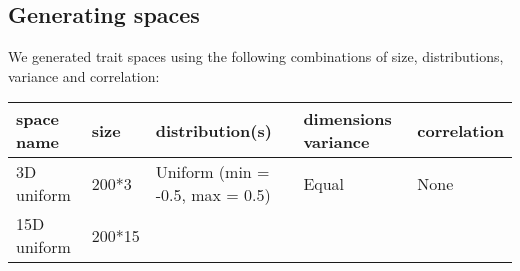 \documentclass[]{article}
\begin{document}
\subsection{Generating spaces}\label{generating-spaces}

We generated trait spaces using the following combinations of size,
distributions, variance and correlation:

\renewcommand\baselinestretch{1}\selectfont

\begin{longtable}[]{@{}lllll@{}}
\toprule
\begin{minipage}[b]{0.12\columnwidth}\raggedright\strut
space name\strut
\end{minipage} & \begin{minipage}[b]{0.08\columnwidth}\raggedright\strut
size\strut
\end{minipage} & \begin{minipage}[b]{0.31\columnwidth}\raggedright\strut
distribution(s)\strut
\end{minipage} & \begin{minipage}[b]{0.21\columnwidth}\raggedright\strut
dimensions variance\strut
\end{minipage} & \begin{minipage}[b]{0.13\columnwidth}\raggedright\strut
correlation\strut
\end{minipage}\tabularnewline
\midrule
\endhead
\begin{minipage}[t]{0.12\columnwidth}\raggedright\strut
3D uniform\strut
\end{minipage} & \begin{minipage}[t]{0.08\columnwidth}\raggedright\strut
200*3\strut
\end{minipage} & \begin{minipage}[t]{0.31\columnwidth}\raggedright\strut
Uniform (min = -0.5, max = 0.5)\strut
\end{minipage} & \begin{minipage}[t]{0.21\columnwidth}\raggedright\strut
Equal\strut
\end{minipage} & \begin{minipage}[t]{0.13\columnwidth}\raggedright\strut
None\strut
\end{minipage}\tabularnewline
\begin{minipage}[t]{0.12\columnwidth}\raggedright\strut
15D uniform\strut
\end{minipage} & \begin{minipage}[t]{0.08\columnwidth}\raggedright\strut
200*15\strut

\end{minipage}
\end{longtable}
\end{document}
